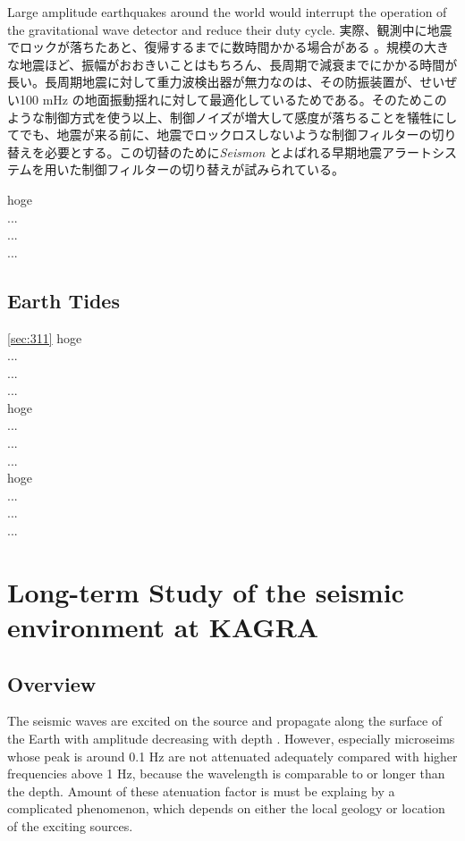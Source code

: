 Large amplitude earthquakes around the world would interrupt the operation of the gravitational wave detector and reduce their duty cycle. 実際、観測中に地震でロックが落ちたあと、復帰するまでに数時間かかる場合がある \cite{Coughlin2015real}。規模の大きな地震ほど、振幅がおおきいことはもちろん、長周期で減衰までにかかる時間が長い。長周期地震に対して重力波検出器が無力なのは、その防振装置が、せいぜい100 $\mathrm{mHz}$ の地面振動揺れに対して最適化しているためである\cite{}。そのためこのような制御方式を使う以上、制御ノイズが増大して感度が落ちることを犠牲にしてでも、地震が来る前に、地震でロックロスしないような制御フィルターの切り替えを必要とする。この切替のために\textit{Seismon} とよばれる早期地震アラートシステム\cite{Coughlin2017limiting}を用いた制御フィルターの切り替えが試みられている\cite{Biscans2018control}。

hoge\\
...\\
...\\
...\\


\subsection{Earth Tides} \label{sec:314}
\cref{sec:311}
hoge\\
...\\
...\\
...\\

hoge\\
...\\
...\\
...\\

hoge\\
...\\
...\\
...\\


\newpage
\section{Long-term Study of the seismic environment at KAGRA}
\subsection{Overview}
The seismic waves are excited on the source and propagate along the surface of the Earth with amplitude decreasing with depth \cite{carter1991high}. However, especially microseims whose peak is around 0.1 $\mathrm{Hz}$ are not attenuated adequately compared with higher frequencies above 1 $\mathrm{Hz}$, because the wavelength is comparable to or longer than the depth. Amount of these atenuation factor is must be explaing by a complicated phenomenon, which depends on either the local geology or location of the exciting sources. 


